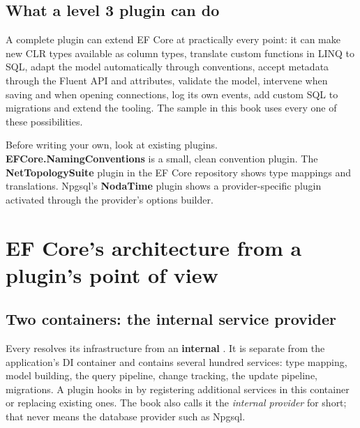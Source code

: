 \section{What a level 3 plugin can do}

A complete plugin can extend EF Core at practically every point: it can make new CLR types
available as column types, translate custom functions in LINQ to SQL, adapt the model
automatically through conventions, accept metadata through the Fluent API and attributes,
validate the model, intervene when saving and when opening connections, log its own events,
add custom SQL to migrations and extend the  tooling. The sample in this
book uses every one of these possibilities.

\begin{tip}
  Before writing your own, look at existing plugins. \textbf{EFCore.NamingConventions} is a
  small, clean convention plugin. The \textbf{NetTopologySuite} plugin in the EF Core
  repository shows type mappings and translations. Npgsql's \textbf{NodaTime} plugin shows a
  provider-specific plugin activated through the provider's options builder.
\end{tip}

\chapter{EF Core's architecture from a plugin's point of view}\label{ch:ef-core-s-architecture-from}

\section{Two containers: the internal service provider}

Every  resolves its infrastructure from an \textbf{internal}
. It is separate from the application's DI container and
contains several hundred services: type mapping, model building, the query pipeline, change
tracking, the update pipeline, migrations. A plugin hooks in by registering additional
services in this container or replacing existing ones. The book also calls it the
\emph{internal provider} for short; that never means the database provider such as Npgsql.

\begin{flowdiagram}
\end{flowdiagram}

